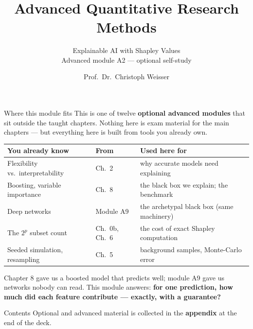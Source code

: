 \documentclass[aspectratio=169,11pt]{beamer}
\title{Advanced Quantitative Research Methods}
\subtitle{Explainable AI with Shapley Values\\[2pt]{\small Advanced module A2 --- optional self-study}}
\author{Prof.\ Dr.\ Christoph Weisser}
\date{}\graphicspath{{images/}}
\begin{document}
\begin{frame}[plain]\titlepage\end{frame}

\begin{frame}{Where this module fits}
  \footnotesize
  This is one of twelve \textbf{optional advanced modules} that sit outside the taught chapters.
  Nothing here is exam material for the main chapters --- but everything here is built
  from tools you already own.
  \begin{center}
  \begin{tabular}{@{}lll@{}}
    \toprule
    \textbf{You already know} & \textbf{From} & \textbf{Used here for} \\
    \midrule
    Flexibility vs.\ interpretability & Ch.\ 2 & why accurate models need explaining \\
    Boosting, variable importance & Ch.\ 8 & the black box we explain; the benchmark \\
    Deep networks & Module A9 & the archetypal black box (same machinery) \\
    The $2^p$ subset count & Ch.\ 0b, Ch.\ 6 & the cost of exact Shapley computation \\
    Seeded simulation, resampling & Ch.\ 5 & background samples, Monte-Carlo error \\
    \bottomrule
  \end{tabular}
  \end{center}
  \vspace{2pt}
  \begin{takeaway}
    Chapter 8 gave us a boosted model that predicts well; module A9 gave us networks
    nobody can read. This module answers: \textbf{for one prediction, how much did each
    feature contribute --- exactly, with a guarantee?}
  \end{takeaway}
\end{frame}

\begin{frame}{Contents}\small\tableofcontents[hideallsubsections]
  \vfill
  {\tiny Optional and advanced material is collected in the \textbf{appendix} at the end of the deck.}
\end{frame}
\end{document}
